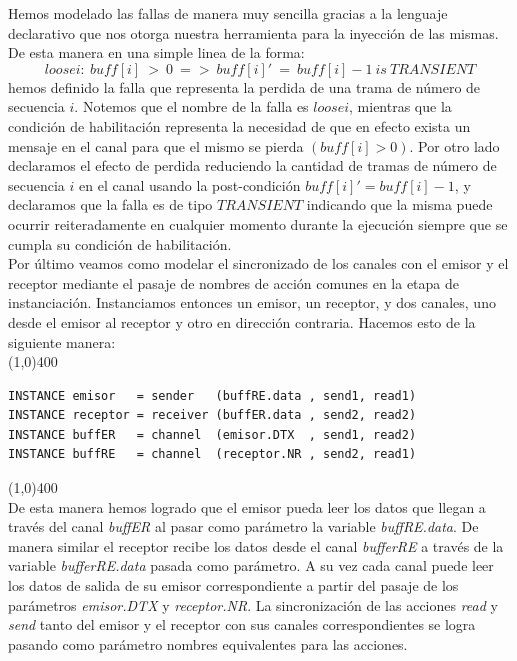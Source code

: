 \documentclass[titlepage, 12pt]{book}
\begin{document}
Hemos modelado las fallas de manera muy sencilla gracias a la lenguaje declarativo que nos otorga nuestra herramienta para la inyecci\'on de las mismas. De esta manera en una simple linea de la forma: $$ loosei:~buff[i]~>~0~=>~buff[i]'~=~buff[i]-1~is~TRANSIENT $$ hemos definido la falla que representa la perdida de una trama de n\'umero de secuencia $i$. Notemos que el nombre de la falla es $loosei$, mientras que la condici\'on de habilitaci\'on representa la necesidad de que en efecto exista un mensaje en el canal para que el mismo se pierda $( buff[i] > 0 )$. Por otro lado declaramos el efecto de perdida reduciendo la cantidad de tramas de n\'umero de secuencia $i$ en el canal usando la post-condici\'on $buff[i]' = buff[i]-1$, y declaramos que la falla es de tipo $TRANSIENT$ indicando que la misma puede ocurrir reiteradamente en cualquier momento durante la ejecuci\'on siempre que se cumpla su condici\'on de habilitaci\'on.\\

Por \'ultimo veamos como modelar el sincronizado de los canales con el emisor y el receptor mediante el pasaje de nombres de acci\'on comunes en la etapa de instanciaci\'on. Instanciamos entonces un emisor, un receptor, y dos canales, uno desde el emisor al receptor y otro en direcci\'on contraria. Hacemos esto de la siguiente manera:\\

\noindent \line(1,0){400}
\begin{verbatim}
INSTANCE emisor   = sender   (buffRE.data , send1, read1)
INSTANCE receptor = receiver (buffER.data , send2, read2)
INSTANCE buffER   = channel  (emisor.DTX  , send1, read2)
INSTANCE buffRE   = channel  (receptor.NR , send2, read1)
\end{verbatim}
\noindent \line(1,0){400}\\

De esta manera hemos logrado que el emisor pueda leer los datos que llegan a trav\'es del canal \textit{buffER} al pasar como par\'ametro la variable \textit{buffRE.data}. De manera similar el receptor recibe los datos desde el canal \textit{bufferRE} a trav\'es de la variable \textit{bufferRE.data} pasada como par\'ametro. A su vez cada canal puede leer los datos de salida de su emisor correspondiente a partir del pasaje de los par\'ametros \textit{emisor.DTX} y \textit{receptor.NR}. La sincronizaci\'on de las acciones \textit{read} y \textit{send} tanto del emisor y el receptor con sus canales correspondientes se logra pasando como par\'ametro nombres equivalentes para las acciones.\\
\end{document}
